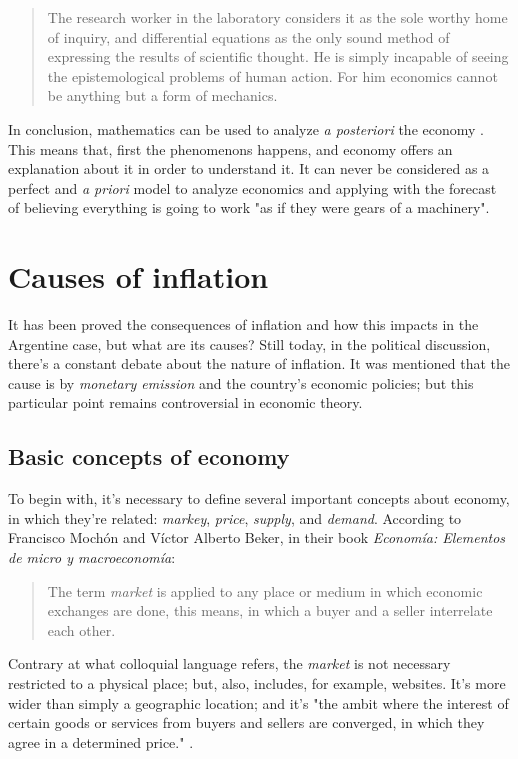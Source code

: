\documentclass[12pt,a4paper,twoside]{book}
\begin{document}
\begin{quotation}
The research worker in the laboratory considers it as the sole worthy home of inquiry, and differential equations as the only sound method of expressing the results of scientific thought. He is simply incapable of seeing the epistemological problems of human action. For him economics cannot be anything but a form of mechanics. \cite[p. 8]{mises:ha}
\end{quotation}

In conclusion, mathematics can be used to analyze \textit{a posteriori} the economy . This means that, first the phenomenons happens, and economy offers an explanation about it in order to understand it. It can never be considered as a perfect and \textit{a priori} model to analyze economics and applying with the forecast of believing everything is going to work "as if they were gears of a machinery".

\section{Causes of inflation}
It has been proved the consequences of inflation and how this impacts in the Argentine case, but what are its causes? Still today, in the political discussion, there's a constant debate about the nature of inflation. It was mentioned that the cause is by \textit{monetary emission} and the country's economic policies; but this particular point remains controversial in economic theory.

\subsection{Basic concepts of economy}
To begin with, it's necessary to define several important concepts about economy, in which they're related: \textit{markey}, \textit{price}, \textit{supply}, and \textit{demand}. According to Francisco Mochón and Víctor Alberto Beker, in their book \textit{Economía: Elementos de micro y macroeconomía}:

\begin{quotation}
The term \textit{market} is applied to any place or medium in which economic exchanges are done, this means, in which a buyer and a seller interrelate each other. \cite[p. 86]{mochobeker}
\end{quotation}

Contrary at what colloquial language refers, the \textit{market} is not necessary restricted to a physical place; but, also, includes, for example, websites. It's more wider than simply a geographic location; and it's "the ambit where the interest of certain goods or services from buyers and sellers are converged, in which they agree in a determined price." \cite[p. 85]{mochobeker}.
\end{document}
